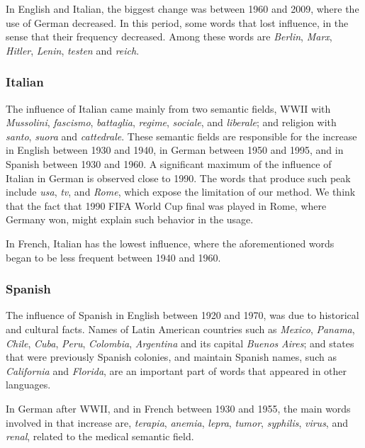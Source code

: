 \documentclass[10pt,letterpaper]{article} %
\begin{document}
In English and Italian, the biggest change was between 1960 and 2009, where the
use of German decreased. In this period, some words that lost influence, in the
sense that their frequency decreased. 
Among these words are 
\textit{Berlin}, \textit{Marx},
\textit{Hitler}, \textit{Lenin}, \textit{testen}  and \textit{reich}.
\subsubsection*{Italian} %


The influence of Italian came mainly from two semantic fields,  WWII with
\textit{Mussolini}, \textit{fascismo}, \textit{battaglia}, \textit{regime},
\textit{sociale}, and \textit{liberale}; and religion with \textit{santo},
\textit{suora} and \textit{cattedrale}. These semantic fields are
responsible for the increase in English between 1930 and 1940, in German
between 1950 and 1995, and in Spanish between 1930 and 1960.
A significant maximum of the influence of Italian in German is observed close to 1990. 
The words that produce such peak include 
\textit{usa},  \textit{tv}, and \textit{Rome}, which expose the limitation of our method. 
We think that the fact that 1990 FIFA World Cup final was played in Rome, where Germany won, might explain such behavior in the usage. 
% 

In French, Italian has the lowest influence, where the aforementioned words
began to be less frequent between 1940 and 1960.
\subsubsection*{Spanish} %

The influence of Spanish in English between 1920 and 1970, was due to
historical and cultural facts. Names of Latin American  countries such as
\textit{Mexico}, \textit{Panama}, \textit{Chile}, \textit{Cuba}, \textit{Peru},
\textit{Colombia}, \textit{Argentina} and its capital \textit{Buenos}
\textit{Aires};  and states that were previously Spanish colonies, and maintain Spanish names, such as \textit{California} and
\textit{Florida}, are an important part of words that appeared in 
other languages. 

In German after WWII, and in French between 1930 and 1955, the main words
involved in that increase are, \textit{terapia}, \textit{anemia},
\textit{lepra}, \textit{tumor}, \textit{syphilis}, \textit{virus}, and
\textit{renal}, related to the medical semantic field. 
\end{document}
